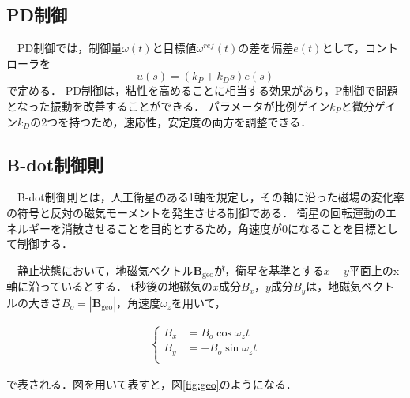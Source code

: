 \subsection{PD制御}

　PD制御では，制御量$\omega(t)$と目標値$\omega^{ref}(t)$の差を偏差$e(t)$として，コントローラを
\begin{equation}
    u(s) = (k_P+k_Ds)e(s)
\end{equation}
で定める．
PD制御は，粘性を高めることに相当する効果があり，P制御で問題となった振動を改善することができる．
パラメータが比例ゲイン$k_P$と微分ゲイン$k_D$の2つを持つため，速応性，安定度の両方を調整できる\cite{kawata}． 

\subsection{B-dot制御則}
　B-dot制御則とは，人工衛星のある1軸を規定し，その軸に沿った磁場の変化率の符号と反対の磁気モーメントを発生させる制御である．
衛星の回転運動のエネルギーを消散させることを目的とするため，角速度が0になることを目標として制御する\cite{bdot}．

　静止状態において，地磁気ベクトル$\boldsymbol{B}_\mathrm{geo}$が，衛星を基準とする$x-y$平面上のx軸に沿っているとする．
t秒後の地磁気の$x$成分$B_x$，$y$成分$B_y$は，地磁気ベクトルの大きさ$B_o=|\boldsymbol{B}_\mathrm{geo}|$，角速度$\omega_z$を用いて，

\begin{align}
    \left\{
        \begin{aligned}
            B_x &= B_o\cos\omega_zt\\
            B_y &= -B_o\sin\omega_zt\\
        \end{aligned}                    
    \right.
\end{align}

で表される．図を用いて表すと，図\ref{fig:geo}のようになる．

